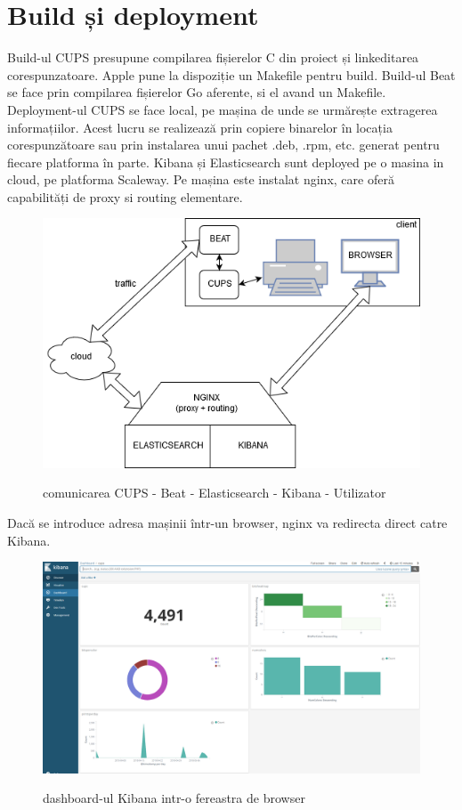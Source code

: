 \documentclass[a4paper, 12pt, twoside]{report}
\begin{document}
	\section{Build și deployment}
	Build-ul CUPS presupune compilarea fișierelor C din proiect și linkeditarea corespunzatoare. Apple pune la dispoziție un Makefile pentru build. Build-ul Beat se face prin compilarea fișierelor Go aferente, si el avand un Makefile.
	Deployment-ul CUPS se face local, pe mașina de unde se urmărește extragerea informațiilor. Acest lucru se realizează prin copiere binarelor în locația corespunzătoare sau prin instalarea unui pachet .deb, .rpm, etc. generat pentru fiecare platforma în parte.
	Kibana și Elasticsearch sunt deployed pe o masina in cloud, pe platforma Scaleway. Pe mașina este instalat nginx, care oferă capabilități de proxy si routing elementare.
	\begin{figure}
		\centering
		{\includegraphics[width=130mm]{cups-cloud.png}}
	\caption{comunicarea CUPS - Beat - Elasticsearch - Kibana - Utilizator}
	\end{figure}	
	Dacă se introduce adresa mașinii într-un browser, nginx va redirecta direct catre Kibana.
	\begin{figure}
		\centering
		{\includegraphics[width=160mm]{kibana-dashboard.png}}
		\caption{dashboard-ul Kibana intr-o fereastra de browser}
	\end{figure}
\end{document}

